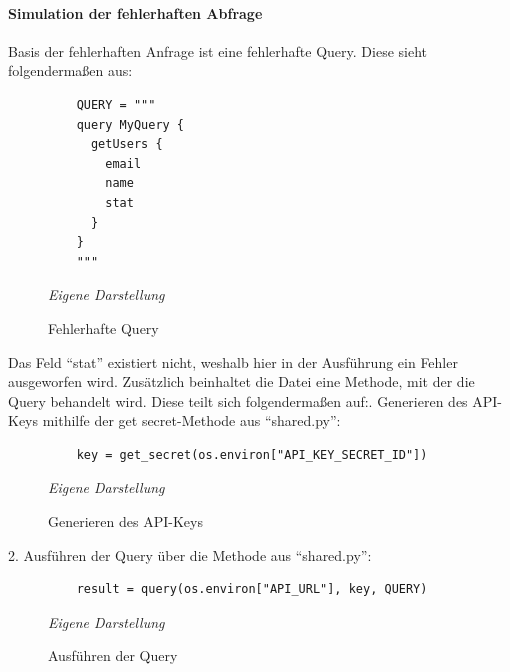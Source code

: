 \paragraph{Simulation der fehlerhaften Abfrage}
Basis der fehlerhaften Anfrage ist eine fehlerhafte Query. Diese sieht folgendermaßen aus:\newline
	\begin{figure}[H]
	\centering
	\begin{minipage}[t]{.7\textwidth} %
	\caption{Fehlerhafte Query} %
	\begin{verbatim}
	QUERY = """
	query MyQuery {
	  getUsers {
	    email
	    name
	    stat
	  }
	}
	"""
	\end{verbatim}
	
	\textit{Eigene Darstellung} %
	\label{fig:fehlerhafteQuery}
	\end{minipage}
	\end{figure}
Das Feld ``stat'' existiert nicht, weshalb hier in der Ausführung ein Fehler ausgeworfen wird. 
\newline
Zusätzlich beinhaltet die Datei eine Methode, mit der die Query behandelt wird. Diese teilt sich folgendermaßen auf:. Generieren des API-Keys mithilfe der get secret-Methode aus ``shared.py'':\newline
	\begin{figure}[H]
	\centering
	\begin{minipage}[t]{.7\textwidth} %
	\caption{Generieren des API-Keys} %
	\begin{verbatim}
	key = get_secret(os.environ["API_KEY_SECRET_ID"])
	\end{verbatim}
	
	\textit{Eigene Darstellung} %
	\label{fig:apiKeyGenerierung}
	\end{minipage}
	\end{figure}
2. Ausführen der Query über die Methode aus  ``shared.py'':\newline
	\begin{figure}[H]
	\centering
	\begin{minipage}[t]{.7\textwidth} %
	\caption{Ausführen der Query} %
	\begin{verbatim}
	result = query(os.environ["API_URL"], key, QUERY)
	\end{verbatim}
	
	\textit{Eigene Darstellung} %
	\label{fig:queryAusführung}
	\end{minipage}
	\end{figure}
